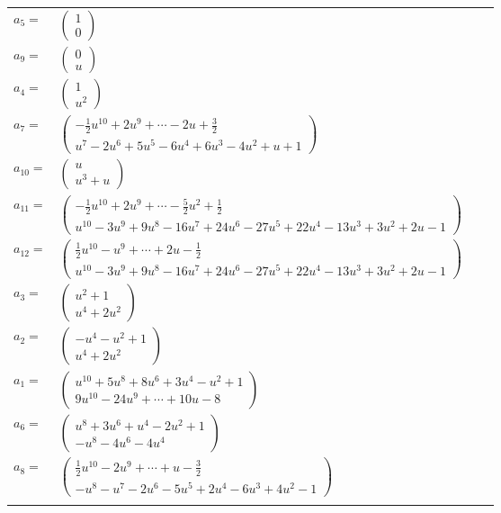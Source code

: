 \documentclass[1p]{elsarticle_modified}
\theoremstyle{definition}
\begin{document}
\begin{tabular}{m{7pt} m{180pt} m{7pt} m{180pt} }
\flushright $a_{5}=$&$\begin{pmatrix}1\\0\end{pmatrix}$ \\
\flushright $a_{9}=$&$\begin{pmatrix}0\\u\end{pmatrix}$ \\
\flushright $a_{4}=$&$\begin{pmatrix}1\\u^2\end{pmatrix}$ \\
\flushright $a_{7}=$&$\begin{pmatrix}-\frac{1}{2} u^{10}+2 u^9+\cdots-2 u+\frac{3}{2}\\u^7-2 u^6+5 u^5-6 u^4+6 u^3-4 u^2+u+1\end{pmatrix}$ \\
\flushright $a_{10}=$&$\begin{pmatrix}u\\u^3+u\end{pmatrix}$ \\
\flushright $a_{11}=$&$\begin{pmatrix}-\frac{1}{2} u^{10}+2 u^9+\cdots-\frac{5}{2} u^2+\frac{1}{2}\\u^{10}-3 u^9+9 u^8-16 u^7+24 u^6-27 u^5+22 u^4-13 u^3+3 u^2+2 u-1\end{pmatrix}$ \\
\flushright $a_{12}=$&$\begin{pmatrix}\frac{1}{2} u^{10}- u^9+\cdots+2 u-\frac{1}{2}\\u^{10}-3 u^9+9 u^8-16 u^7+24 u^6-27 u^5+22 u^4-13 u^3+3 u^2+2 u-1\end{pmatrix}$ \\
\flushright $a_{3}=$&$\begin{pmatrix}u^2+1\\u^4+2 u^2\end{pmatrix}$ \\
\flushright $a_{2}=$&$\begin{pmatrix}- u^4- u^2+1\\u^4+2 u^2\end{pmatrix}$ \\
\flushright $a_{1}=$&$\begin{pmatrix}u^{10}+5 u^8+8 u^6+3 u^4- u^2+1\\9 u^{10}-24 u^9+\cdots+10 u-8\end{pmatrix}$ \\
\flushright $a_{6}=$&$\begin{pmatrix}u^8+3 u^6+u^4-2 u^2+1\\- u^8-4 u^6-4 u^4\end{pmatrix}$ \\
\flushright $a_{8}=$&$\begin{pmatrix}\frac{1}{2} u^{10}-2 u^9+\cdots+u-\frac{3}{2}\\- u^8- u^7-2 u^6-5 u^5+2 u^4-6 u^3+4 u^2-1\end{pmatrix}$\\&\end{tabular}
\end{document}
